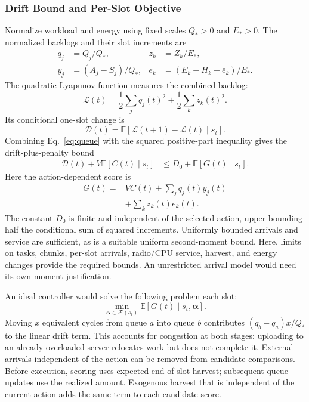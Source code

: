 \documentclass[journal]{IEEEtran}
\begin{document}
\subsubsection{Drift Bound and Per-Slot Objective}
Normalize workload and energy using fixed scales $Q_*>0$ and $E_*>0$. The normalized backlogs and their slot increments are
\[
\begin{aligned}
q_j&=Q_j/Q_*, & z_k&=Z_k/E_*,\\
y_j&=(A_j-S_j)/Q_*, &
e_k&=(E_k-H_k-\bar e_k)/E_*.
\end{aligned}
\]
The quadratic Lyapunov function measures the combined backlog:
\[
\mathcal L(t)=\frac12\sum_j q_j(t)^2
             +\frac12\sum_k z_k(t)^2.
\]
Its conditional one-slot change is
\[
\mathcal D(t)=\mathbb E\!\left[
 \mathcal L(t+1)-\mathcal L(t)\mid s_t\right].
\]
Combining Eq.~\eqref{eq:queue} with the squared positive-part inequality gives the drift-plus-penalty bound
\begin{equation}
\begin{aligned}
\mathcal D(t)+V\mathbb E[C(t)\mid s_t]
 &\le D_0+\mathbb E[G(t)\mid s_t].
\end{aligned}
\label{eq:drift}
\end{equation}
Here the action-dependent score is
\[
\begin{aligned}
G(t)={}&VC(t)+\sum_j q_j(t)y_j(t)\\
       &+\sum_k z_k(t)e_k(t).
\end{aligned}
\]
The constant $D_0$ is finite and independent of the selected action, upper-bounding half the conditional sum of squared increments. Uniformly bounded arrivals and service are sufficient, as is a suitable uniform second-moment bound. Here, limits on tasks, chunks, per-slot arrivals, radio/CPU service, harvest, and energy changes provide the required bounds. An unrestricted arrival model would need its own moment justification.

An ideal controller would solve the following problem each slot:
\begin{equation}
\min_{\boldsymbol\alpha\in\mathcal F(s_t)}
 \mathbb E[G(t)\mid s_t,\boldsymbol\alpha].
\label{eq:slot_problem}
\end{equation}
Moving $x$ equivalent cycles from queue $a$ into queue $b$ contributes $(q_b-q_a)x/Q_*$ to the linear drift term. This accounts for congestion at both stages: uploading to an already overloaded server relocates work but does not complete it. External arrivals independent of the action can be removed from candidate comparisons. Before execution, scoring uses expected end-of-slot harvest; subsequent queue updates use the realized amount. Exogenous harvest that is independent of the current action adds the same term to each candidate score.
\end{document}
